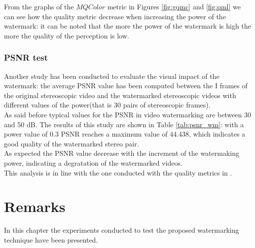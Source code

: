 From the graphs of the $MQColor$ metric in Figures \ref{fig:gqmc} and \ref{fig:qml} we can see how the quality metric decrease when increasing the power of the watermark: it can be noted that the more the power of the watermark is high the more the quality of the perception is low.

\subsubsection{PSNR test}

Another study has been conducted to evaluate the visual impact of the watermark: the average PSNR value has been computed between the I frames of the original stereoscopic video and the watermarked stereoscopic videos with different values of the power(that is 30 pairs of stereoscopic frames).\\
As said before typical values for the PSNR in video watermarking are between 30 and 50 dB.
The results of this study are shown in Table \ref{tab:psnr_wm}: with a power value of $0.3$ PSNR reaches a maximum value of $44.438$, which indicates a good quality of the watermarked stereo pair. \\
As expected the PSNR value decrease with the increment of the watermaking power, indicating a degratation of the watermarked videos.\\ This analysis is in line with the one conducted with the quality metrics in \cite{QMETRICS}.

\begin{table}[h!]
\begin{center}
\caption{\small{Average PSNR values between original video and watermarked videos with increasing value of the power.} \label{tab:psnr_wm}}
\end{center}
\end{table}
\clearpage
\section{Remarks}

In this chapter the experiments conducted to test the proposed watermarking technique have been presented.

